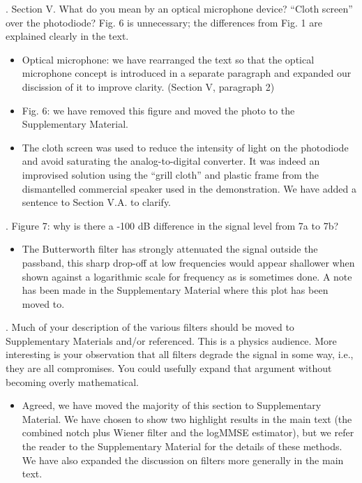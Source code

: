 \documentclass{article}
\newcommand{\todo}{\textcolor{blue}}
\begin{document}
. Section V.  What do you mean by an optical microphone device?  “Cloth screen” over the photodiode?  Fig. 6 is unnecessary; the differences from Fig. 1 are explained clearly in the text.
\begin{itemize}
\item Optical microphone: we have rearranged the text so that the optical microphone concept is introduced in a separate paragraph and expanded our discission of it to improve clarity. (Section V, paragraph 2)
\item Fig. 6: we have removed this figure and moved the photo to the Supplementary Material.
\item The cloth screen was used to reduce the intensity of light on the photodiode and avoid saturating the analog-to-digital converter. It was indeed an improvised solution using the ``grill cloth'' and plastic frame from the dismantelled commercial speaker used in the demonstration. We have added a sentence to Section V.A. to clarify.
\end{itemize}  



. Figure 7: why is there a -100 dB difference in the signal level from 7a to 7b?  
\begin{itemize}
\item The Butterworth filter has strongly attenuated the signal outside the passband, this sharp drop-off at low frequencies would appear shallower when shown against a logarithmic scale for frequency as is sometimes done. A note has been made in the Supplementary Material where this plot has been moved to.
\end{itemize}


. Much of your description of the various filters should be moved to Supplementary Materials and/or referenced.  This is a physics audience.  More interesting is your observation that all filters degrade the signal in some way, i.e., they are all compromises.  You could usefully expand that argument without becoming overly mathematical.
\begin{itemize}
\item Agreed, we have moved the majority of this section to Supplementary Material. We have chosen to show two highlight results in the main text (the combined notch plus Wiener filter and the logMMSE estimator), but we refer the reader to the Supplementary Material for the details of these methods. We have also expanded the discussion on filters more generally in the main text. 
\end{itemize}
\end{document}
